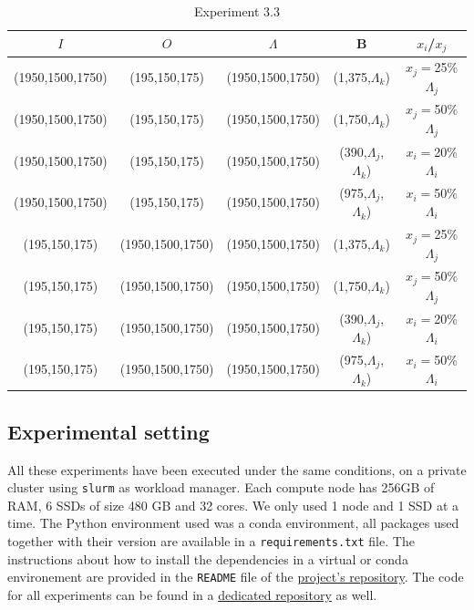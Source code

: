 \documentclass[conference]{IEEEtran}
\begin{document}
\begin{table}[ht]
 \centering
 \caption{Experiment 3.3}

  \begin{tabular}[t]{c c c c c}
  \hline
    $I$ & $O$ & $\Lambda$ & B & $x_i$/$x_j$\\
    \hline\hline
    (1950,1500,1750) & (195,150,175) & (1950,1500,1750) & (1,375,$\Lambda_k$) & $x_j=$25\%$\Lambda_j$ \\
    \hline
    (1950,1500,1750) & (195,150,175) & (1950,1500,1750) & (1,750,$\Lambda_k$) & $x_j=$50\%$\Lambda_j$ \\
    \hline
    (1950,1500,1750) & (195,150,175) & (1950,1500,1750) & (390,$\Lambda_j$,$\Lambda_k$) & $x_i=$20\%$\Lambda_i$ \\
    \hline
    (1950,1500,1750) & (195,150,175) & (1950,1500,1750) & (975,$\Lambda_j$,$\Lambda_k$) & $x_i=$50\%$\Lambda_i$ \\
    \hline
    (195,150,175) & (1950,1500,1750) & (1950,1500,1750) & (1,375,$\Lambda_k$) & $x_j=$25\%$\Lambda_j$ \\
    \hline
    (195,150,175) & (1950,1500,1750) & (1950,1500,1750) & (1,750,$\Lambda_k$) & $x_j=$50\%$\Lambda_j$ \\
    \hline
    (195,150,175) & (1950,1500,1750) & (1950,1500,1750) & (390,$\Lambda_j$,$\Lambda_k$) & $x_i=$20\%$\Lambda_i$ \\
    \hline
    (195,150,175) & (1950,1500,1750) & (1950,1500,1750) & (975,$\Lambda_j$,$\Lambda_k$) & $x_i=$50\%$\Lambda_i$ \\
    \hline
  \end{tabular}

  \label{tab:exp3_3}
\end{table}

\subsection{Experimental setting}
All these experiments have been executed under the same conditions, on a private
cluster using \texttt{slurm} as workload manager. Each compute node has 256GB of
RAM, 6 SSDs of size 480 GB and 32 cores. We only used 1 node and 1 SSD at a
time. The Python environment used was a
conda environment, all packages used together with their version are available
in a \texttt{requirements.txt} file. The instructions about how to install the
dependencies in a virtual or
conda environement are provided in the \texttt{README} file of the
\href{https://github.com/big-data-lab-team/dask_io}{project's repository}. The
code for all experiments can be found in a
\href{https://github.com/GTimothee/dask_io_experiments}{dedicated repository}
as well.
\end{document}
